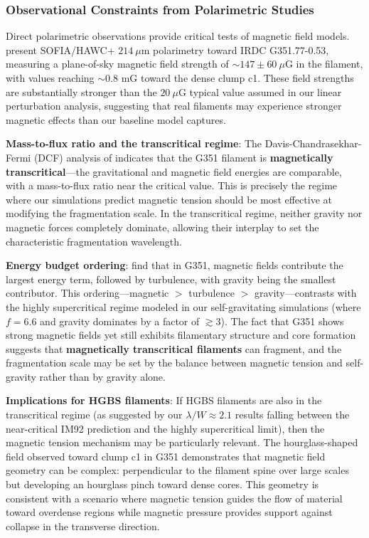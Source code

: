 \documentclass[11pt,a4paper]{article}
\begin{document}
\subsubsection{Observational Constraints from Polarimetric Studies}

Direct polarimetric observations provide critical tests of magnetic field models. \citet{Jadhav2026} present SOFIA/HAWC+ $214~\mu$m polarimetry toward IRDC G351.77-0.53, measuring a plane-of-sky magnetic field strength of $\sim147 \pm 60~\mu$G in the filament, with values reaching $\sim0.8$ mG toward the dense clump c1. These field strengths are substantially stronger than the $20~\mu$G typical value assumed in our linear perturbation analysis, suggesting that real filaments may experience stronger magnetic effects than our baseline model captures.

\textbf{Mass-to-flux ratio and the transcritical regime}: The Davis-Chandrasekhar-Fermi (DCF) analysis of \citet{Jadhav2026} indicates that the G351 filament is \textbf{magnetically transcritical}—the gravitational and magnetic field energies are comparable, with a mass-to-flux ratio near the critical value. This is precisely the regime where our simulations predict magnetic tension should be most effective at modifying the fragmentation scale. In the transcritical regime, neither gravity nor magnetic forces completely dominate, allowing their interplay to set the characteristic fragmentation wavelength.

\textbf{Energy budget ordering}: \citet{Jadhav2026} find that in G351, magnetic fields contribute the largest energy term, followed by turbulence, with gravity being the smallest contributor. This ordering—magnetic $>$ turbulence $>$ gravity—contrasts with the highly supercritical regime modeled in our self-gravitating simulations (where $f = 6.6$ and gravity dominates by a factor of $\gtrsim 3$). The fact that G351 shows strong magnetic fields yet still exhibits filamentary structure and core formation suggests that \textbf{magnetically transcritical filaments} can fragment, and the fragmentation scale may be set by the balance between magnetic tension and self-gravity rather than by gravity alone.

\textbf{Implications for HGBS filaments}: If HGBS filaments are also in the transcritical regime (as suggested by our $\lambda/W \approx 2.1$ results falling between the near-critical IM92 prediction and the highly supercritical limit), then the magnetic tension mechanism may be particularly relevant. The hourglass-shaped field observed toward clump c1 in G351 \citep{Jadhav2026} demonstrates that magnetic field geometry can be complex: perpendicular to the filament spine over large scales but developing an hourglass pinch toward dense cores. This geometry is consistent with a scenario where magnetic tension guides the flow of material toward overdense regions while magnetic pressure provides support against collapse in the transverse direction.
\end{document}
